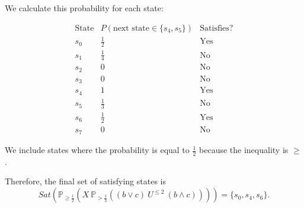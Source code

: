 \documentclass[12pt,a4paper]{article}
\begin{document}
\begin{description}
\begin{enumerate}[label=\alph*)]
We calculate this probability for each state:

\[
\begin{array}{c|c|c}
\text{State} & P(\text{next state}\in\{s_4,s_5\})
& \text{Satisfies?}\\
\hline
s_0 & \frac{1}{2} & \text{Yes}\\
s_1 & \frac{1}{4} & \text{No}\\
s_2 & 0 & \text{No}\\
s_3 & 0 & \text{No}\\
s_4 & 1 & \text{Yes}\\
s_5 & \frac{1}{3} & \text{No}\\
s_6 & \frac{1}{2} & \text{Yes}\\
s_7 & 0 & \text{No}
\end{array}
\]

We include states where the probability is equal to
$\frac{1}{2}$ because the inequality is $\geq$.

Therefore, the final set of satisfying states is
\[
\boxed{
Sat\left(
\mathbb{P}_{\geq \frac{1}{2}}
\left(
X\ \mathbb{P}_{>\frac{1}{3}}
\left(
(b\lor c)\ U^{\leq 2}\ (b\land c)
\right)
\right)
\right)
=
\{s_0,s_4,s_6\}.
}
\]

\end{enumerate} 
\color{black}
\fi


\end{description}
\end{document}
